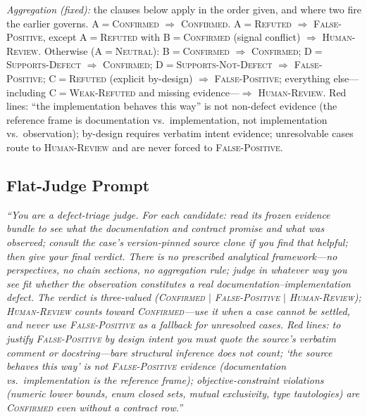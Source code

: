 \documentclass[acmsmall,screen,review,anonymous]{acmart}
\begin{document}
\emph{Aggregation (fixed):} the clauses below apply in the order given, and where two fire the earlier governs. A${=}$\textsc{Confirmed} $\Rightarrow$ \textsc{Confirmed}. A${=}$\textsc{Refuted} $\Rightarrow$ \textsc{False-Positive}, except A${=}$\textsc{Refuted} with B${=}$\textsc{Confirmed} (signal conflict) $\Rightarrow$ \textsc{Human-Review}. Otherwise (A${=}$\textsc{Neutral}): B${=}$\textsc{Confirmed} $\Rightarrow$ \textsc{Confirmed}; D${=}$\textsc{Supports-Defect} $\Rightarrow$ \textsc{Confirmed}; D${=}$\textsc{Supports-Not-Defect} $\Rightarrow$ \textsc{False-Positive}; C${=}$\textsc{Refuted} (explicit by-design) $\Rightarrow$ \textsc{False-Positive}; everything else---including C${=}$\textsc{Weak-Refuted} and missing evidence---$\Rightarrow$ \textsc{Human-Review}. Red lines: ``the implementation behaves this way'' is not non-defect evidence (the reference frame is documentation vs.\ implementation, not implementation vs.\ observation); by-design requires verbatim intent evidence; unresolvable cases route to \textsc{Human-Review} and are never forced to \textsc{False-Positive}.

\subsection{Flat-Judge Prompt}
\label{app:flat-prompt}

\emph{``You are a defect-triage judge. For each candidate: read its frozen evidence bundle to see what the documentation and contract promise and what was observed; consult the case's version-pinned source clone if you find that helpful; then give your final verdict. There is no prescribed analytical framework---no perspectives, no chain sections, no aggregation rule; judge in whatever way you see fit whether the observation constitutes a real documentation--implementation defect. The verdict is three-valued (\textsc{Confirmed} $\mid$ \textsc{False-Positive} $\mid$ \textsc{Human-Review}); \textsc{Human-Review} counts toward \textsc{Confirmed}---use it when a case cannot be settled, and never use \textsc{False-Positive} as a fallback for unresolved cases. Red lines: to justify \textsc{False-Positive} by design intent you must quote the source's verbatim comment or docstring---bare structural inference does not count; `the source behaves this way' is not \textsc{False-Positive} evidence (documentation vs.\ implementation is the reference frame); objective-constraint violations (numeric lower bounds, enum closed sets, mutual exclusivity, type tautologies) are \textsc{Confirmed} even without a contract row.''}
\end{document}
